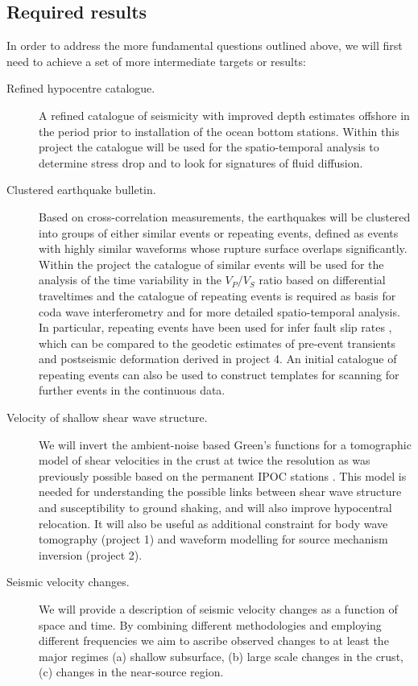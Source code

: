 \documentclass[11pt]{article}
\newcommand{\note}[1]{{\it \color{red} #1}}
\newcommand{\noteft}[1]{{\it \color{magenta} FT:#1}}
\newcommand{\note}[1]{}
\newcommand{\noteft}[1]{}
\begin{document}
\subsection*{Required results}
In order to address the more fundamental questions outlined above, we will first need to achieve a set of more intermediate targets or results:
\begin{description}
 \item[Refined hypocentre catalogue.] A refined catalogue of seismicity with improved depth estimates offshore in the period prior to installation of the ocean bottom stations.  Within this project the catalogue will be used for the spatio-temporal analysis to determine stress drop and to look for signatures of fluid diffusion.
 \item[Clustered earthquake bulletin.] Based on cross-correlation measurements, the earthquakes will be clustered into groups of either similar events or repeating events, defined as events with highly similar waveforms whose rupture surface overlaps significantly. Within the project the catalogue of similar events will be used for the analysis of the time variability in the $V_P/V_S$ ratio based on differential traveltimes and the catalogue of repeating events is required as basis for coda wave interferometry and for more detailed spatio-temporal analysis. In particular, repeating events have been used for infer fault slip rates \citep{nadeau:1998,uchida04}, which can be compared to the  geodetic estimates of pre-event transients and postseismic deformation derived in project 4. %
 An initial catalogue of repeating events can also be used to construct templates for scanning for further events in the continuous data. 
 \item[Velocity of shallow shear wave structure.] We will invert the ambient-noise based Green's functions for a tomographic model of shear velocities in the crust at twice the resolution as was previously possible based on the permanent IPOC stations \citep{ward13}. This model is needed for understanding the possible links between shear wave structure and susceptibility to ground shaking, and will also improve hypocentral relocation. It will also be useful as additional constraint for body wave tomography (project 1) and waveform modelling for source mechanism inversion (project 2). 
\item[Seismic velocity changes.] We will provide a description of seismic velocity changes as a function of space and time. By combining different methodologies and employing different frequencies we aim to ascribe observed changes to at least the major regimes (a) shallow subsurface, (b) large scale changes in the crust, (c) changes in the near-source region.   
\end{description}
\end{document}

